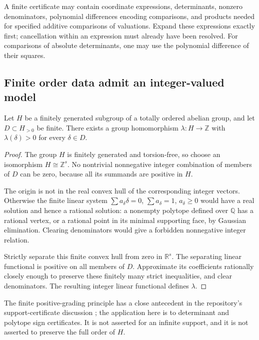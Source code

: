 \documentclass[11pt,a4paper]{article}
\numberwithin{equation}{section}
\theoremstyle{plain}
\newcommand{\R}{\mathbb R}
\newcommand{\Q}{\mathbb Q}
\newcommand{\Z}{\mathbb Z}
\begin{document}
A finite certificate may contain coordinate expressions, determinants,
nonzero denominators, polynomial differences encoding comparisons,
and products needed for specified additive comparisons of valuations.
Expand these expressions exactly first; cancellation within an expression
must already have been resolved. For comparisons of absolute determinants,
one may use the polynomial difference of their squares.

\subsection{Finite order data admit an integer-valued model}
\begin{lemma}
\label{poly:mv:lem:grading}
Let $H$ be a finitely generated subgroup of a totally ordered abelian
group, and let $D\subset H_{>0}$ be finite. There exists a group
homomorphism $\lambda:H\to\Z$ with $\lambda(\delta)>0$ for every
$\delta\in D$.
\end{lemma}
\begin{proof}
The group $H$ is finitely generated and torsion-free, so choose an
isomorphism $H\cong\Z^s$. No nontrivial nonnegative integer combination
of members of $D$ can be zero, because all its summands are positive in
$H$.

The origin is not in the real convex hull of the corresponding integer
vectors. Otherwise the finite linear system
$\sum a_\delta\delta=0$, $\sum a_\delta=1$, $a_\delta\ge0$ would
have a real solution and hence a rational solution: a nonempty polytope
defined over $\Q$ has a rational vertex, or a rational point in its
minimal supporting face, by Gaussian elimination. Clearing denominators
would give a forbidden nonnegative integer relation.

Strictly separate this finite convex hull from zero in $\R^s$. The
separating linear functional is positive on all members of $D$. Approximate
its coefficients rationally closely enough to preserve these finitely
many strict inequalities, and clear denominators. The resulting integer
linear functional defines $\lambda$.
\end{proof}

The finite positive-grading principle has a close antecedent in the
repository's support-certificate discussion \cite{mv:RepoReversion}; the
application here is to determinant and polytope sign certificates. It is
not asserted for an infinite support, and it is not asserted to preserve
the full order of $H$.
\end{document}
